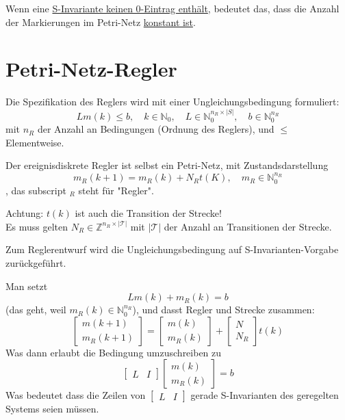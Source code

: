 Wenn eine \underline{S-Invariante keinen 0-Eintrag enthält},
bedeutet das, dass die Anzahl der Markierungen im Petri-Netz
\underline{konstant ist}.

\section{Petri-Netz-Regler}


Die Spezifikation des Reglers wird mit einer Ungleichungsbedingung
formuliert:
\begin{equation}
    L m(k) \leq b, \quad k\in\mathbb{N}_0, \quad L\in\mathbb{N}_0^{n_R\times |S|}, \quad  b\in\mathbb{N}_0^{n_R}
\end{equation}
mit $n_R$ der Anzahl an Bedingungen (Ordnung des Reglers),
und $\leq$ Elementweise.

Der ereignisdiskrete Regler ist selbst ein Petri-Netz,
mit Zustandsdarstellung
\begin{equation}
    m_R(k+1) = m_R(k)+N_Rt(K), \quad m_R \in \mathbb{N}_0^{n_R}
\end{equation}
, das subscript $_R$ steht für "Regler".

Achtung: $t(k)$ ist auch die Transition der Strecke!\\
Es muss gelten $N_R \in \mathbb{Z}^{n_R \times |\mathcal{T}|}$
mit $|\mathcal{T}|$ der Anzahl an Transitionen der Strecke.

Zum Reglerentwurf wird die Ungleichungsbedingung auf S-Invarianten-Vorgabe
zurückgeführt.

Man setzt
\begin{equation}
    Lm(k) + m_R(k) = b
\end{equation}
(das geht, weil $m_R(k) \in \mathbb{N}_0^{n_R}$),
und dasst Regler und Strecke zusammen:
\begin{equation}
    \begin{bmatrix}
        m(k+1)\\m_R(k+1)
    \end{bmatrix}
    =
    \begin{bmatrix}
        m(k)\\m_R(k)
    \end{bmatrix}
    +
    \begin{bmatrix}
       N\\N_R 
    \end{bmatrix}
    t(k)
\end{equation}
Was dann erlaubt die Bedingung umzuschreiben zu
\begin{equation}
    \begin{bmatrix}
        L&I
    \end{bmatrix}
    \begin{bmatrix}
        m(k)\\m_R(k)
    \end{bmatrix}
    =b
\end{equation}
Was bedeutet dass die Zeilen von $\begin{bmatrix}
    L&I
\end{bmatrix}$ gerade S-Invarianten des geregelten Systems seien müssen.

